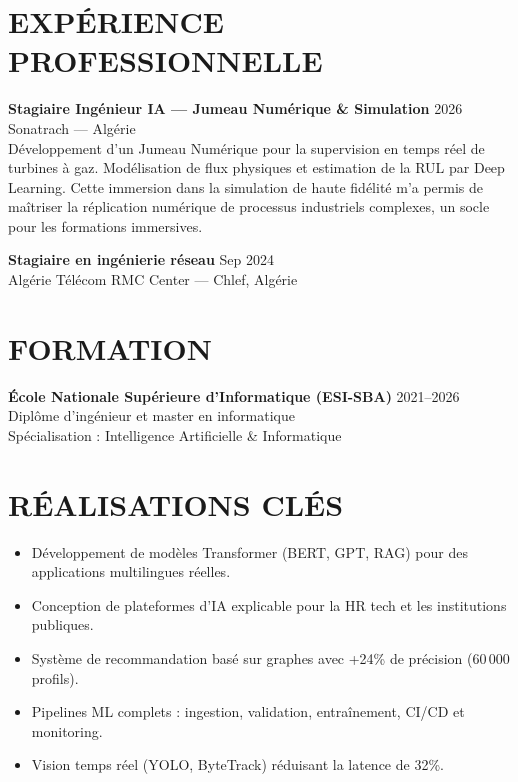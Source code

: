 \documentclass[a4paper,12pt]{article}
\begin{document}
\section{EXPÉRIENCE PROFESSIONNELLE}
\textbf{Stagiaire Ingénieur IA — Jumeau Numérique \& Simulation} \hfill 2026 \\
Sonatrach — Algérie \\
Développement d’un Jumeau Numérique pour la supervision en temps réel de turbines à gaz. Modélisation de flux physiques et estimation de la RUL par Deep Learning. Cette immersion dans la simulation de haute fidélité m’a permis de maîtriser la réplication numérique de processus industriels complexes, un socle pour les formations immersives.

\textbf{Stagiaire en ingénierie réseau} \hfill Sep 2024 \\
Algérie Télécom RMC Center — Chlef, Algérie

\section{FORMATION}
\textbf{École Nationale Supérieure d’Informatique (ESI-SBA)} \hfill 2021--2026 \\
Diplôme d’ingénieur et master en informatique \\
Spécialisation : Intelligence Artificielle \& Informatique

\section{RÉALISATIONS CLÉS}
\begin{itemize}
    \item Développement de modèles Transformer (BERT, GPT, RAG) pour des applications multilingues réelles.
    \item Conception de plateformes d’IA explicable pour la HR tech et les institutions publiques.
    \item Système de recommandation basé sur graphes avec +24\% de précision (60\,000 profils).
    \item Pipelines ML complets : ingestion, validation, entraînement, CI/CD et monitoring.
    \item Vision temps réel (YOLO, ByteTrack) réduisant la latence de 32\%.
\end{itemize}

\end{document}
